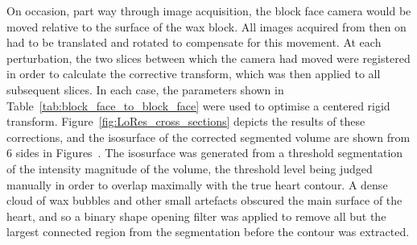     On occasion, part way through image acquisition, the block face camera would be moved relative to the surface of the wax block. All images acquired from then on had to be translated and rotated to compensate for this movement. At each perturbation, the two slices between which the camera had moved were registered in order to calculate the corrective transform, which was then applied to all subsequent slices. In each case, the parameters shown in Table~\ref{tab:block_face_to_block_face} were used to optimise a centered rigid transform. Figure~\ref{fig:LoRes_cross_sections} depicts the results of these corrections, and the isosurface of the corrected segmented volume are shown from 6 sides in Figures~. The isosurface was generated from a threshold segmentation of the intensity magnitude of the volume, the threshold level being judged manually in order to overlap maximally with the true heart contour. A dense cloud of wax bubbles and other small artefacts obscured the main surface of the heart, and so a binary shape opening filter was applied to remove all but the largest connected region from the segmentation before the contour was extracted.
    
